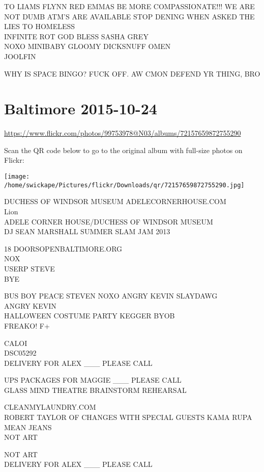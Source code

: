 \documentclass[10pt,letterpaper]{article}
\begin{document}
TO LIAMS FLYNN RED EMMAS BE MORE COMPASSIONATE!!! WE ARE NOT DUMB ATM'S ARE AVAILABLE STOP DENING WHEN ASKED THE LIES TO HOMELESS\\
INFINITE ROT GOD BLESS SASHA GREY\\
NOXO MINIBABY GLOOMY DICKSNUFF OMEN\\
JOOLFIN

WHY IS SPACE BINGO?  FUCK OFF.  AW CMON DEFEND YR THING, BRO
\pagebreak

\section*{Baltimore 2015-10-24}

\url{https://www.flickr.com/photos/99753978@N03/albums/72157659872755290}

Scan the QR code below to go to the original album with full-size photos on Flickr:

\texttt{[image: /home/swickape/Pictures/flickr/Downloads/qr/72157659872755290.jpg]}
\pagebreak

DUCHESS OF WINDSOR MUSEUM ADELECORNERHOUSE.COM\\
Lion\\
ADELE CORNER HOUSE/DUCHESS OF WINDSOR MUSEUM\\
DJ SEAN MARSHALL SUMMER SLAM JAM 2013

18 DOORSOPENBALTIMORE.ORG\\
NOX\\
USERP STEVE\\
BYE

BUS BOY PEACE STEVEN NOXO ANGRY KEVIN SLAYDAWG\\
ANGRY KEVIN\\
HALLOWEEN COSTUME PARTY KEGGER BYOB\\
FREAKO!  F+

CALOI\\
DSC05292\\
DELIVERY FOR ALEX \_\_\_ PLEASE CALL

UPS PACKAGES FOR MAGGIE \_\_\_ PLEASE CALL\\
GLASS MIND THEATRE BRAINSTORM REHEARSAL

CLEANMYLAUNDRY.COM\\
ROBERT TAYLOR OF CHANGES WITH SPECIAL GUESTS KAMA RUPA\\
MEAN JEANS\\
NOT ART

NOT ART\\
DELIVERY FOR ALEX \_\_\_ PLEASE CALL
\end{document}
